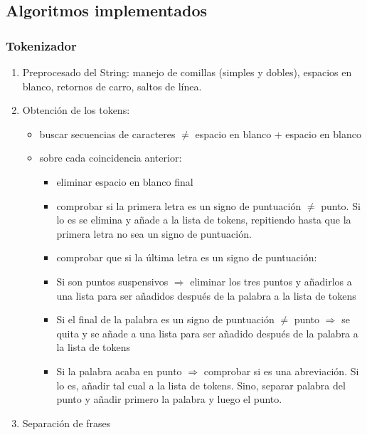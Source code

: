 \documentclass{beamer}
\begin{document}
\subsection{Algoritmos implementados}
\begin{frame}
\frametitle{Tokenizador}
\begin{enumerate}
\item Preprocesado del String: manejo de comillas (simples y dobles), espacios en blanco, retornos de carro, saltos de línea.
\item Obtención de los tokens: 
\begin{itemize}\fontsize{8}{8}\selectfont
\item buscar secuencias de caracteres $\neq$ espacio en blanco + espacio en blanco
\item sobre cada coincidencia anterior: \begin{itemize}\fontsize{8}{7}\selectfont
	\item eliminar espacio en blanco final 
	\item comprobar si la primera letra es un signo de puntuación $\neq$ punto. Si lo es se elimina y añade a la lista de tokens, repitiendo hasta que la primera letra no sea un signo de puntuación.
	\item comprobar que si la última letra es un signo de puntuación: 
\item Si son puntos suspensivos $\Rightarrow$ eliminar los tres puntos  y añadirlos a una lista para ser añadidos después de la palabra a la lista de tokens
\item Si el final de la palabra es un signo de puntuación $\neq$ punto $\Rightarrow$ se quita y se añade a una lista para ser añadido después de la palabra a la lista de tokens
\item Si la palabra acaba en punto $\Rightarrow$ comprobar si es una abreviación. Si lo es, añadir tal cual a la lista de tokens. Sino, separar palabra del punto y añadir primero la palabra y luego el punto.
\end{itemize}
\end{itemize}
\item Separación de frases
\end{enumerate}
\end{frame}
\end{document}
